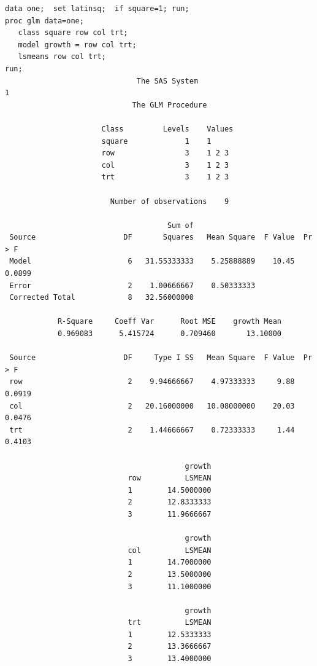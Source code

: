\begin{small}
\begin{verbatim}
data one;  set latinsq;  if square=1; run;
proc glm data=one;
   class square row col trt;
   model growth = row col trt;
   lsmeans row col trt;
run;
                              The SAS System                              1
                             The GLM Procedure
 
                      Class         Levels    Values
                      square             1    1     
                      row                3    1 2 3 
                      col                3    1 2 3 
                      trt                3    1 2 3 

                        Number of observations    9

                                     Sum of
 Source                    DF       Squares   Mean Square  F Value  Pr > F
 Model                      6   31.55333333    5.25888889    10.45  0.0899
 Error                      2    1.00666667    0.50333333                 
 Corrected Total            8   32.56000000                               

            R-Square     Coeff Var      Root MSE    growth Mean
            0.969083      5.415724      0.709460       13.10000

 Source                    DF     Type I SS   Mean Square  F Value  Pr > F
 row                        2    9.94666667    4.97333333     9.88  0.0919
 col                        2   20.16000000   10.08000000    20.03  0.0476
 trt                        2    1.44666667    0.72333333     1.44  0.4103

                                         growth
                            row          LSMEAN
                            1        14.5000000
                            2        12.8333333
                            3        11.9666667

                                         growth
                            col          LSMEAN
                            1        14.7000000
                            2        13.5000000
                            3        11.1000000

                                         growth
                            trt          LSMEAN
                            1        12.5333333
                            2        13.3666667
                            3        13.4000000
\end{verbatim}
\end{small}
